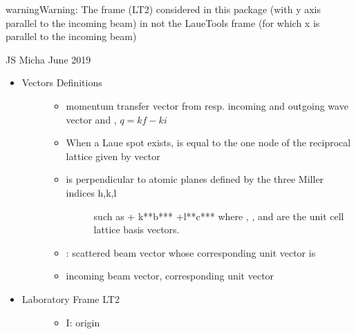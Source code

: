 \documentclass[letterpaper,10pt,english]{sphinxmanual}
\begin{document}
\begin{sphinxadmonition}{warning}{Warning:}
The frame (LT2) considered in this package (with y axis parallel to the incoming beam) in not the LaueTools frame (for which x is parallel to the incoming beam)
\end{sphinxadmonition}

JS Micha June 2019
\begin{itemize}
\item {} \begin{description}
\item[{Vectors Definitions}] \leavevmode\begin{itemize}
\item {} 
 momentum transfer vector from resp. incoming and outgoing wave vector  and , \(q=kf-ki\)

\item {} 
When a Laue spot exists,  is equal to the one node of the reciprocal lattice given by  vector

\item {} \begin{description}
\item[{ is perpendicular to atomic planes defined by the three Miller indices h,k,l}] \leavevmode
such as  + k**b*** +l**c*** where , , and  are the unit cell lattice basis vectors.

\end{description}

\item {} 
: scattered beam vector whose corresponding unit vector is 

\item {} 
 incoming beam vector,  corresponding unit vector

\end{itemize}

\end{description}

\item {} \begin{description}
\item[{Laboratory Frame LT2}] \leavevmode\begin{itemize}
\item {} 
I: origin


\end{itemize}
\end{description}
\end{itemize}
\end{document}
